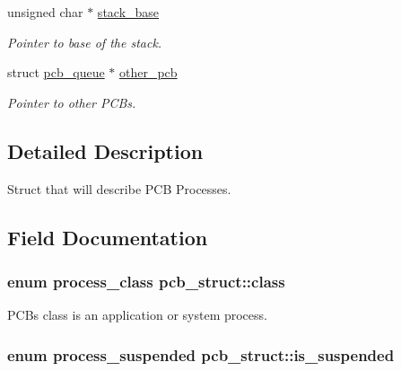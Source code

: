 \begin{DoxyCompactItemize}
unsigned char $\ast$ \hyperlink{structpcb__struct_a8365cb3b483002fecc259df14301f30f}{stack\+\_\+base}
\begin{DoxyCompactList}\small\item\em Pointer to base of the stack. \end{DoxyCompactList}\item 
struct \hyperlink{structpcb__queue}{pcb\+\_\+queue} $\ast$ \hyperlink{structpcb__struct_aba9f99ef03e34c9f9ef79053a255ba27}{other\+\_\+pcb}
\begin{DoxyCompactList}\small\item\em Pointer to other P\+C\+Bs. \end{DoxyCompactList}\end{DoxyCompactItemize}


\subsection{Detailed Description}
Struct that will describe P\+CB Processes. 

\subsection{Field Documentation}
\subsubsection[{\texorpdfstring{class}{class}}]{\setlength{\rightskip}{0pt plus 5cm}enum {\bf process\+\_\+class} pcb\+\_\+struct\+::class}\hypertarget{structpcb__struct_a3957f5586930529631c9a428a30b7325}{}\label{structpcb__struct_a3957f5586930529631c9a428a30b7325}


P\+CB\textquotesingle{}s class is an application or system process. 

\subsubsection[{\texorpdfstring{is\+\_\+suspended}{is_suspended}}]{\setlength{\rightskip}{0pt plus 5cm}enum {\bf process\+\_\+suspended} pcb\+\_\+struct\+::is\+\_\+suspended}\hypertarget{structpcb__struct_aefb20b3b3c88e40e18ed2b505262d788}{}\label{structpcb__struct_aefb20b3b3c88e40e18ed2b505262d788}



